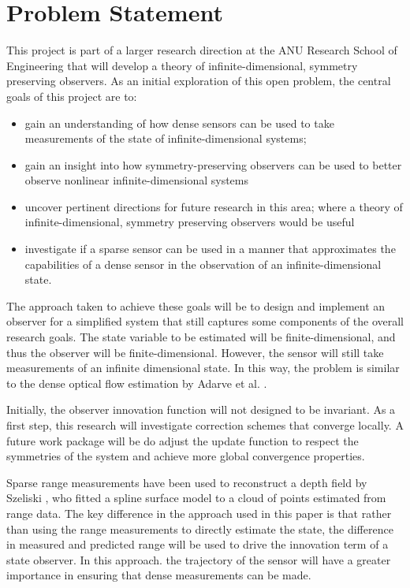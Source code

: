 \chapter{Problem Statement} \label{chap:problem}
This project is part of a larger research direction at the ANU Research School of Engineering that will develop a theory of infinite-dimensional, symmetry preserving observers.
As an initial exploration of this open problem, the central goals of this project are to:
\begin{itemize}
\item gain an understanding of how dense sensors can be used to take measurements of the state of infinite-dimensional systems;
\item gain an insight into how symmetry-preserving observers can be used to better observe nonlinear infinite-dimensional systems
\item uncover pertinent directions for future research in this area; where a theory of infinite-dimensional, symmetry preserving observers would be useful
\item investigate if a sparse sensor can be used in a manner that approximates the capabilities of a dense sensor in the observation of an infinite-dimensional state.
\end{itemize}

The approach taken to achieve these goals will be to design and implement an observer for a simplified system that still captures some components of the overall research goals.
The state variable to  be estimated will be finite-dimensional, and thus the observer will be finite-dimensional. However, the sensor will still take measurements of an infinite dimensional state. In this way, the problem is similar to the dense optical flow estimation by Adarve et al. \cite{adarvefiltering}.

Initially, the observer innovation function will not designed to be invariant. As a first step, this research will investigate correction schemes that converge locally. A future work package will be do adjust the update function to respect the symmetries of the system and achieve more global convergence properties. 

Sparse range measurements have been used to reconstruct a depth field by Szeliski \cite{szeliski1988estimating}, who fitted a spline surface model to a cloud of points estimated from range data. The key difference in the approach used in this paper is that rather than using the range measurements to directly estimate the state, the difference in measured and predicted range will be used to drive the innovation term of a state observer. In this approach. the trajectory of the sensor will have a greater importance in ensuring that dense measurements can be made.

